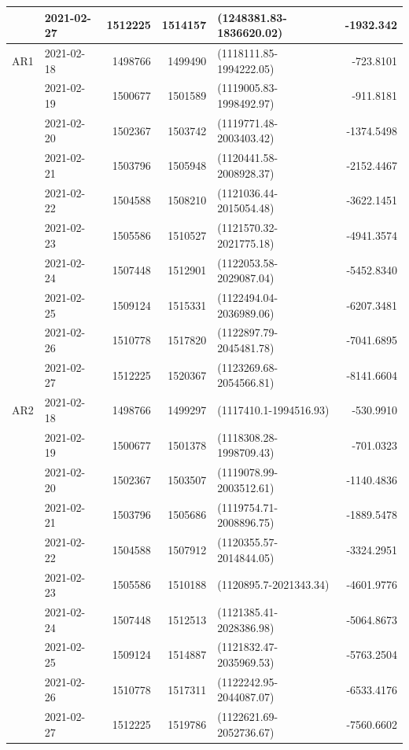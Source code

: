 \documentclass[10pt,letterpaper]{article}
\begin{document}
\begin{table}[!h]
\begin{tabular}[t]{l|l|r|r|l|r}
&2021-02-27 & 1512225 & 1514157 & (1248381.83-1836620.02) & -1932.342\\
\hline
AR1&2021-02-18 & 1498766 & 1499490 & (1118111.85-1994222.05) & -723.8101\\
&2021-02-19 & 1500677 & 1501589 & (1119005.83-1998492.97) & -911.8181\\
&2021-02-20 & 1502367 & 1503742 & (1119771.48-2003403.42) & -1374.5498\\
&2021-02-21 & 1503796 & 1505948 & (1120441.58-2008928.37) & -2152.4467\\
&2021-02-22 & 1504588 & 1508210 & (1121036.44-2015054.48) & -3622.1451\\
&2021-02-23 & 1505586 & 1510527 & (1121570.32-2021775.18) & -4941.3574\\
&2021-02-24 & 1507448 & 1512901 & (1122053.58-2029087.04) & -5452.8340\\
&2021-02-25 & 1509124 & 1515331 & (1122494.04-2036989.06) & -6207.3481\\
&2021-02-26 & 1510778 & 1517820 & (1122897.79-2045481.78) & -7041.6895\\
&2021-02-27 & 1512225 & 1520367 & (1123269.68-2054566.81) & -8141.6604\\
\hline
AR2&2021-02-18 & 1498766 & 1499297 & (1117410.1-1994516.93) & -530.9910\\
&2021-02-19 & 1500677 & 1501378 & (1118308.28-1998709.43) & -701.0323\\
&2021-02-20 & 1502367 & 1503507 & (1119078.99-2003512.61) & -1140.4836\\
&2021-02-21 & 1503796 & 1505686 & (1119754.71-2008896.75) & -1889.5478\\
&2021-02-22 & 1504588 & 1507912 & (1120355.57-2014844.05) & -3324.2951\\
&2021-02-23 & 1505586 & 1510188 & (1120895.7-2021343.34) & -4601.9776\\
&2021-02-24 & 1507448 & 1512513 & (1121385.41-2028386.98) & -5064.8673\\
&2021-02-25 & 1509124 & 1514887 & (1121832.47-2035969.53) & -5763.2504\\
&2021-02-26 & 1510778 & 1517311 & (1122242.95-2044087.07) & -6533.4176\\
&2021-02-27 & 1512225 & 1519786 & (1122621.69-2052736.67) & -7560.6602\\
\hline
\end{tabular}
\end{table}
\end{document}
